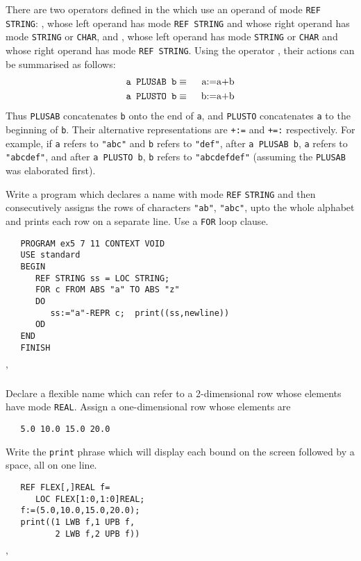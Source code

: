 There are two operators defined in the  which
use an operand of mode \verb|REF STRING|: , whose left
operand has mode \verb|REF STRING| and whose right operand has mode
\verb|STRING| or \verb|CHAR|, and , whose left operand
has mode \verb|STRING| or \verb|CHAR| and whose right operand has
mode \verb|REF STRING|.  Using the  operator
\ixtt{+}, their actions can be summarised as follows:
\begin{eqnarray*}
   \hbox{\tt a PLUSAB b}&\equiv&\hbox{\enskip a:=a+b}\\
   \hbox{\tt a PLUSTO b}&\equiv&\hbox{\enskip b:=a+b}
\end{eqnarray*}
Thus \verb|PLUSAB| concatenates \verb|b| onto the end of \verb|a|,
and \verb|PLUSTO| concatenates \verb|a| to the beginning of \verb|b|.
Their alternative representations are \verb|+:=| and \verb|+=:|
respectively. For example, if \verb|a| refers to \verb|"abc"| and
\verb|b| refers to \verb|"def"|, after \verb|a PLUSAB b|, \verb|a|
refers to \verb|"abcdef"|, and after \verb|a PLUSTO b|, \verb|b|
refers to \verb|"abcdefdef"| (assuming the \verb|PLUSAB| was
elaborated first).

\begin{exercise}
\item Write a program which declares a name with mode \verb|REF|
\verb|STRING| and then consecutively assigns the rows of characters
\verb|"ab"|, \verb|"abc"|, upto the whole alphabet and prints each
row on a separate line. Use a \verb|FOR| loop clause.  \ans \ %
\begin{verbatim}
   PROGRAM ex5 7 11 CONTEXT VOID
   USE standard
   BEGIN
      REF STRING ss = LOC STRING;
      FOR c FROM ABS "a" TO ABS "z"
      DO
         ss:="a"-REPR c;  print((ss,newline))
      OD
   END
   FINISH
\end{verbatim}
'
\item Declare a flexible name which can refer to a 2-dimensional row
whose elements have mode \verb|REAL|.  Assign a one-dimensional row
whose elements are
\begin{verbatim}
   5.0 10.0 15.0 20.0
\end{verbatim}
\noindent
Write the \verb|print| phrase which will display each bound on the screen
followed by a space, all on one line. \ans \ %
\begin{verbatim}
   REF FLEX[,]REAL f=
      LOC FLEX[1:0,1:0]REAL;
   f:=(5.0,10.0,15.0,20.0);
   print((1 LWB f,1 UPB f,
          2 LWB f,2 UPB f))
\end{verbatim}
'
\end{exercise}

